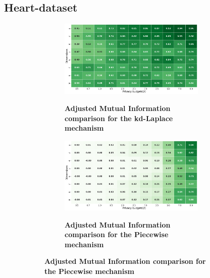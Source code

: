 \subsection{Heart-dataset}
\begin{figure}[H]
  \centering
  \begin{subfigure}[b]{0.90\textwidth}
    \begin{subfigure}[c]{1\textwidth}
      \caption{\textbf{Adjusted Mutual Information comparison for the kd-Laplace mechanism}}
      \includegraphics[width=1\textwidth]{Results/kd-laplace/kd-Laplace/heart-dataset/ami.png}
      \label{fig:ami_heart-dataset_comparison_kdlaplace_2d}
    \end{subfigure}
    \vfill %
    \begin{subfigure}[c]{1\textwidth}
      \caption{\textbf{Adjusted Mutual Information comparison for the Piecewise mechanism}}
      \includegraphics[width=1\textwidth]{Results/kd-laplace/piecewise/heart-dataset/ami.png}
      \label{fig:ami_heart-dataset_comparison_piecewise_2d}
    \end{subfigure}
  \end{subfigure}
  \hfill %
  \begin{subfigure}[b]{0.075\textwidth}

\end{subfigure}
\end{figure}
